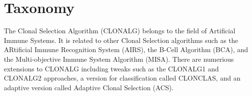 \documentclass[a4paper, 11pt]{article}
\begin{document}
\section{Taxonomy}
\label{sec:taxonomy}
The Clonal Selection Algorithm (CLONALG) belongs to the field of Artificial Immune Systems.
It is related to other Clonal Selection algorithms such as the ARtificial Immune Recognition System (AIRS), the B-Cell Algorithm (BCA), and the Multi-objective Immune System Algorithm (MISA).
There are numerious extensions to CLONALG including tweaks such as the CLONALG1 and CLONALG2 approaches, a version for classification called CLONCLAS,  and an adaptive version called Adaptive Clonal Selection (ACS).

\end{document}
